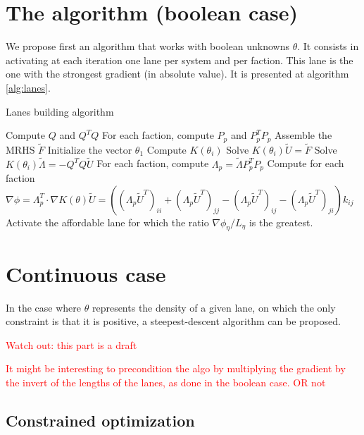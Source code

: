 \documentclass[11pt,a4paper]{article}  %
\begin{document}
\section{The algorithm (boolean case)}

We propose first an algorithm that works with boolean unknowns $\theta$. It consists in activating at each iteration one lane per system and per faction. This lane is the one with the strongest gradient (in absolute value). It is presented at algorithm \ref{alg:lanes}.

\begin{algorithm}[ht]
   \caption{Lanes building algorithm}
   \label{alg:lanes}
   \begin{algorithmic}
      \STATE Compute $Q$ and $Q^TQ$
      \STATE For each faction, compute $P_p$ and $P_p^TP_p$
      \STATE Assemble the MRHS $\tilde{F}$
      \STATE Initialize the vector $\theta_1$
         \STATE Compute $K(\theta_i)$
         \STATE Solve $K(\theta_i)\tilde{U} = \tilde{F}$
         \STATE Solve $K(\theta_i)\tilde{\Lambda} = - Q^TQ\tilde{U}$
         \STATE For each faction, compute $\Lambda_p = \tilde{\Lambda}P_p^TP_p$
         \STATE Compute for each faction $\nabla\phi = \Lambda_p^T \cdot \nabla K(\theta) \tilde{U} = \left( ( \Lambda_p\tilde{U}^T )_{ii} + ( \Lambda_p\tilde{U}^T )_{jj} - ( \Lambda_p\tilde{U}^T )_{ij} - ( \Lambda_p\tilde{U}^T )_{ji} \right) k_{ij}$
               \STATE Activate the affordable lane for which the ratio $\nabla\phi_\eta / L_\eta$ is the greatest.
            \ENDFOR
         \ENDFOR
      \ENDFOR
   \end{algorithmic}
\end{algorithm}

\section{Continuous case}

In the case where $\theta$ represents the density of a given lane, on which the only constraint is that it is positive, a steepest-descent algorithm can be proposed.

\textcolor{red}{Watch out: this part is a draft}

\textcolor{red}{It might be interesting to precondition the algo by multiplying the gradient by the invert of the lengths of the lanes, as done in the boolean case. OR not}

\subsection{Constrained optimization}
\end{document}
